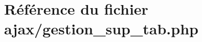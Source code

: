 \hypertarget{gestion__sup__tab_8php}{}\section{Référence du fichier ajax/gestion\+\_\+sup\+\_\+tab.php}
\label{gestion__sup__tab_8php}
